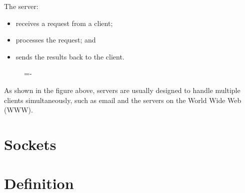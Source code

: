 \documentclass[a4paper]{systems-software}
\begin{document}
The server:
\begin{itemize}
	\item receives a request from a client;
	\item processes the request; and
	\item sends the results back to the client.
\end{itemize}

\begin{figure}[H]
	\lineskip=-\fboxrule
\end{figure}

As shown in the figure above, servers are usually designed to handle multiple clients simultaneously, such as email and the servers on the World Wide Web (WWW).


\section{Sockets}

\section*{Definition}
\end{document}
